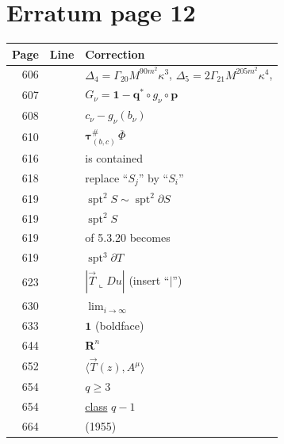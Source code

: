 \documentclass[11pt]{article}
\makeatletter
\newcommand{\R}{\mathbf R}
\newcommand{\restrict}{\mathbin{\llcorner}}
\newcommand{\spt}{\operatorname{spt}}
\newcommand{\entry}[3]{#1&#2&#3\\[4pt]}
\newenvironment{corrections}{%
  \begin{longtable}{@{}r >{\raggedright\arraybackslash}p{21mm} >{\raggedright\arraybackslash}p{118mm}@{}}
  \textbf{Page}&\textbf{Line}&\textbf{Correction}\\\hline\endhead
}{\end{longtable}}
\makeatother
\begin{document}
\section*{Erratum page 12}
\begin{corrections}
\entry{606}{24}{$\Delta_4=\Gamma_{20}M^{90m^2}\kappa^3$, $\Delta_5=2\Gamma_{21}M^{205m^2}\kappa^4$,}
\entry{607}{16}{$G_\nu=\mathbf 1-\mathbf q^*\circ g_\nu\circ\mathbf p$}
\entry{608}{25}{$c_\nu-g_\nu(b_\nu)$}
\entry{610}{20}{$\bm\tau_{(b,c)}^{\#}\,\overline\Phi$}
\entry{616}{19}{is contained}
\entry{618}{11}{replace ``$S_j$'' by ``$S_i$''}
\entry{619}{17}{$\spt^2 S\sim\spt^2\partial S$}
\entry{619}{18}{$\spt^2 S$}
\entry{619}{26}{of 5.3.20 becomes}
\entry{619}{29}{$\spt^3\partial T$}
\entry{623}{14}{$|\vec T\restrict Du|$ (insert ``$|$'')}
\entry{630}{23}{$\displaystyle\lim_{i\to\infty}$}
\entry{633}{7}{$\mathbf 1$ (boldface)}
\entry{644}{23}{$\R^n$}
\entry{652}{12}{$\langle\vec T(z),A^\mu\rangle$}
\entry{654}{8}{$q\ge3$}
\entry{654}{13}{\underline{class} $q-1$}
\entry{664}{43}{(1955)}
\end{corrections}
\end{document}
